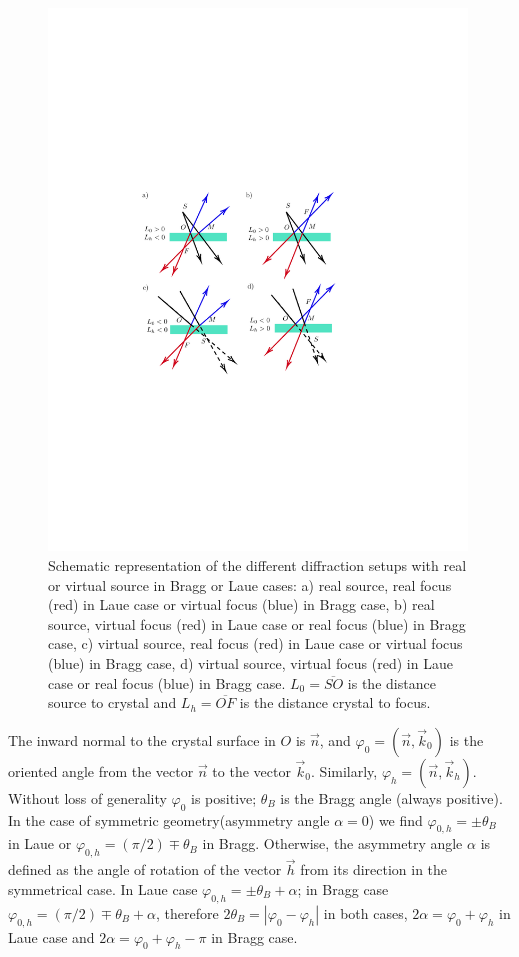 \documentclass[preprint]{iucr}              %
\begin{document}
\begin{figure}
\label{fig:geometries}
\caption{Schematic representation of the different diffraction setups with real or virtual source in Bragg or Laue cases:
a) real source, real focus (red) in Laue case or virtual focus (blue) in Bragg case,
b) real source, virtual focus (red) in Laue case or real focus (blue) in Bragg case,
c) virtual source, real focus (red) in Laue case or virtual focus (blue) in Bragg case,  
d) virtual source, virtual focus (red) in Laue case or real focus (blue) in Bragg case.
$L_0=\overline{SO}$ is the distance source to crystal and $L_h=\overline{OF}$ is the distance crystal to focus.}

\includegraphics[width=0.99\textwidth,trim=4cm 9cm 6cm 9cm,clip=true]{fig1.pdf}
\end{figure}


The inward normal to the crystal surface in $O$ is $\vec n$, and $\varphi_0 = (\vec n, \vec k_0)$ is the oriented angle from the vector $\vec n$ to the vector $\vec k_0$. Similarly, $\varphi_h = (\vec n, \vec k_h)$. Without loss of generality $\varphi_0$ is positive; $\theta_B$ is the Bragg angle (always positive).
In the case of symmetric geometry(asymmetry angle $\alpha=0$) we find $\varphi_{0,h}=\pm\theta_B$ in Laue or $\varphi_{0,h}=(\pi/2)\mp\theta_B$ in Bragg. Otherwise, the asymmetry angle $\alpha$ is defined as the angle of rotation of the vector $\vec h$ from its direction in the symmetrical case. 
In Laue case $\varphi_{0,h}=\pm\theta_B+\alpha$; in Bragg case $\varphi_{0,h}=(\pi/2)\mp\theta_B+\alpha$, therefore $2\theta_B=|\varphi_0-\varphi_h|$ in both cases, $2\alpha=\varphi_0+\varphi_h$ in Laue case and $2\alpha=\varphi_0+\varphi_h-\pi$ in Bragg case.
\end{document}
